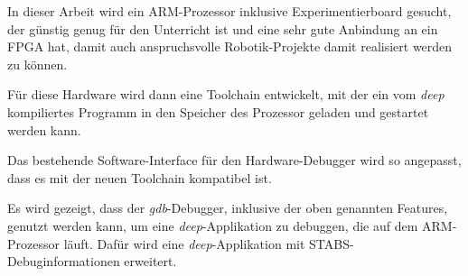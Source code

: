 In dieser Arbeit wird ein ARM-Prozessor inklusive Experimentierboard gesucht, der günstig genug für den Unterricht ist und eine sehr gute Anbindung an ein FPGA hat, damit auch anspruchsvolle Robotik-Projekte damit realisiert werden zu können.

Für diese Hardware wird dann eine Toolchain entwickelt, mit der ein vom \textit{deep} kompiliertes Programm in den Speicher des Prozessor geladen und gestartet werden kann.

Das bestehende Software-Interface für den Hardware-Debugger wird so angepasst, dass es mit der neuen Toolchain kompatibel ist.

Es wird gezeigt, dass der \textit{gdb}-Debugger, inklusive der oben genannten Features, genutzt werden kann, um eine \textit{deep}-Applikation zu debuggen, die auf dem ARM-Prozessor läuft.
Dafür wird eine \textit{deep}-Applikation mit STABS-Debuginformationen erweitert.






